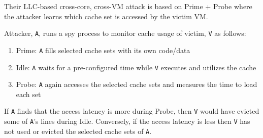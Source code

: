 \documentclass[a4paper,12pt, final]{report}
\begin{document}

Their LLC-based cross-core, cross-VM attack is based on Prime + Probe \cite{prime_probe_l1} where the attacker learns which cache set is accessed by the victim VM.

Attacker, \verb|A|, runs a spy process to monitor cache usage of victim, \verb|V| as follows:
\begin{enumerate}
    \item Prime: \verb|A| fills selected cache sets with its own code/data
    \item Idle: \verb|A| waits for a pre-configured time while \verb|V| executes and utilizes the cache
    \item Probe: \verb|A| again accesses the selected cache sets and measures the time to load each set
\end{enumerate}

If \verb|A| finds that the access latency is more during Probe, then \verb|V| would have evicted some of \verb|A|'s lines during Idle. Conversely, if the access latency is less then \verb|V| has not used or evicted the selected cache sets of \verb|A|.
\end{document}
